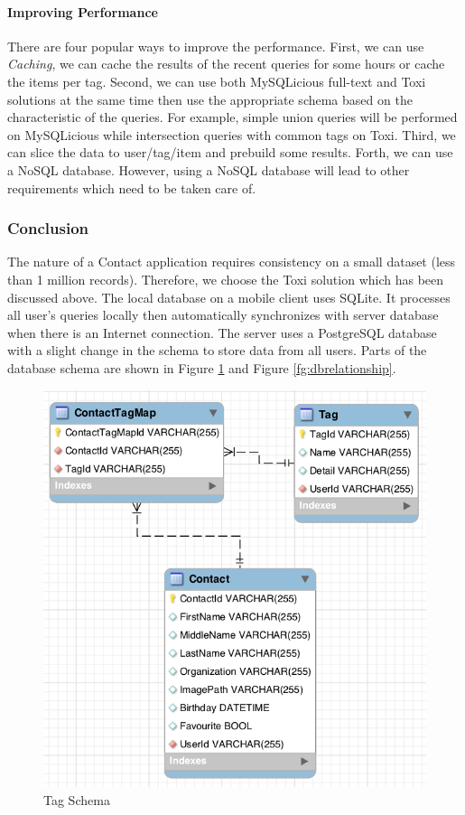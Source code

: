 \paragraph{Improving Performance}
There are four popular ways to improve the performance. First, we can use \textit{Caching}, we can cache the results of the recent queries for some hours or cache the items per tag. Second, we can use both MySQLicious full-text and Toxi solutions at the same time then use the appropriate schema based on the characteristic of the queries. For example, simple union queries will be performed on MySQLicious while intersection queries with common tags on Toxi. Third, we can slice the data to user/tag/item and prebuild some results. Forth, we can use a NoSQL database. However, using a NoSQL database will lead to other requirements which need to be taken care of.

\subsubsection{Conclusion}
The nature of a Contact application requires consistency on a small dataset (less than 1 million records). Therefore, we choose the Toxi \cite{toxi} solution which has been discussed above. The local database on a mobile client uses SQLite. It processes all user's queries locally then automatically synchronizes with server database when there is an Internet connection. The server uses a PostgreSQL database with a slight change in the schema to store data from all users. Parts of the database schema are shown in Figure \ref{fg:dbtag} and Figure \ref{fg:dbrelationship}.

\begin{figure}[!h]
\begin{centering}
\includegraphics[scale=0.5]{pics/dbtag}
\caption{Tag Schema}\label{fg:dbtag}
\end{centering}
\end{figure}

